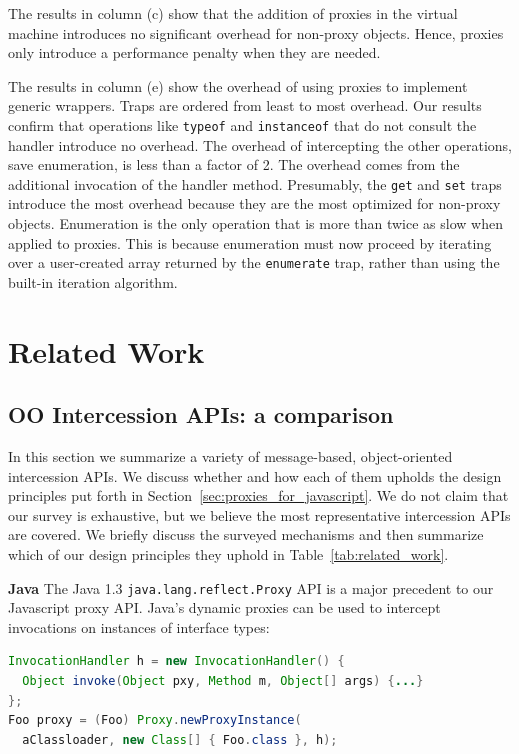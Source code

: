 \documentclass{sig-alternate}
\begin{document}
The results in column (c) show that the addition of proxies in the virtual machine introduces no significant overhead for non-proxy objects. Hence, proxies only introduce a performance penalty when they are needed.

The results in column (e) show the overhead of using proxies to implement generic wrappers. Traps are ordered from least to most overhead. Our results confirm that operations like \texttt{typeof} and \texttt{instanceof} that do not consult the handler introduce no overhead. The overhead of intercepting the other operations, save enumeration, is less than a factor of 2. The overhead comes from the additional invocation of the handler method. Presumably, the \texttt{get} and \texttt{set} traps introduce the most overhead because they are the most optimized for non-proxy objects. Enumeration is the only operation that is more than twice as slow when applied to proxies. This is because enumeration must now proceed by iterating over a user-created array returned by the \texttt{enumerate} trap, rather than using the built-in iteration algorithm.

\section{Related Work}

\subsection{OO Intercession APIs: a comparison}
\label{sub:survey}

In this section we summarize a variety of message-based, object-oriented intercession APIs. We discuss whether and how each of them upholds the design principles put forth in Section~\ref{sec:proxies_for_javascript}. We do not claim that our survey is exhaustive, but we believe the most representative intercession APIs are covered. We briefly discuss the surveyed mechanisms and then summarize which of our design principles they uphold in Table~\ref{tab:related_work}.

\textbf{Java} The Java 1.3 \texttt{java.lang.reflect.Proxy} API is a major precedent to our Javascript proxy API. Java's dynamic proxies can be used to intercept invocations on instances of interface types:

\begin{lstlisting}[language=java]
InvocationHandler h = new InvocationHandler() {
  Object invoke(Object pxy, Method m, Object[] args) {...}
};
Foo proxy = (Foo) Proxy.newProxyInstance(
  aClassloader, new Class[] { Foo.class }, h);
\end{lstlisting}
\end{document}

